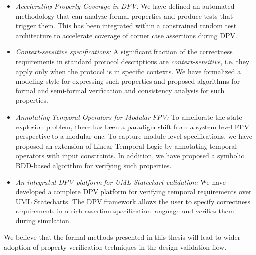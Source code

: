 \begin{itemize}
\item {\em Accelerating Property Coverage in DPV:} We have defined an 
	automated methodology that can analyze formal properties and produce 
	tests that trigger them. This has been integrated within a 
	constrained random test architecture to accelerate coverage of 
	corner case assertions during DPV.

\item {\em Context-sensitive specifications:} A significant fraction
    of the correctness requirements in standard protocol descriptions 
	are {\em context-sensitive}, i.e. they apply only when the 
	protocol is in specific contexts. We have formalized a modeling 
	style for expressing such properties and proposed algorithms 
	for formal and semi-formal verification 
	and consistency analysis for such properties.

\item {\em Annotating Temporal Operators for Modular FPV:}
	To ameliorate the state explosion
    problem, there has been a paradigm shift from a system level FPV
    perspective to a modular one. To capture module-level specifications, 
	we have proposed an extension of Linear Temporal Logic by annotating 
	temporal operators with input constraints. In addition, 
	we have proposed a symbolic BDD-based algorithm for verifying such 
	properties. 

\item {\em An integrated DPV platform for UML Statechart validation:} 
	We have developed a complete DPV platform for verifying temporal 
	requirements over UML Statecharts. The DPV framework allows the user 
	to specify correctness requirements in a rich assertion specification 
	language and verifies them during simulation. 

\end{itemize}
\noindent
We believe that the formal methods presented in
this thesis will lead to wider adoption of property verification techniques 
in the design validation flow.
